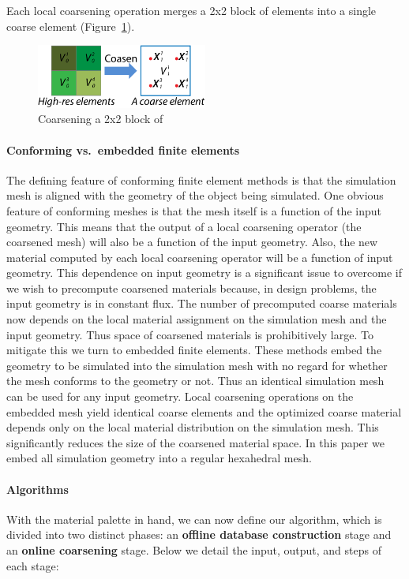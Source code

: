 Each local coarsening operation merges a 2x2 block of elements into a single coarse element (Figure~\ref{fig:coarsen}).
\begin{figure}
	\centering
	
	\includegraphics[width=0.5\textwidth]{images/coarsen.pdf}
	\caption{Coarsening a 2x2 block of }
	\label{fig:coarsen}
\end{figure}
\paragraph{Conforming vs.~embedded finite elements}
The defining feature of conforming finite element methods is that the simulation mesh is aligned with the geometry of the object being simulated. One obvious feature of conforming meshes is that the mesh itself is a function of the input geometry. This means that the output of a local coarsening operator (the coarsened mesh) will also be a function of the input geometry. Also, the new material computed by each local coarsening operator will be a function of input geometry. This dependence on input geometry is a significant issue to overcome if we wish to precompute coarsened materials because, in design problems, the input geometry is in constant flux. The number of precomputed coarse materials now depends on the local material assignment on the simulation mesh and the input geometry. Thus space of coarsened materials is prohibitively large. 
To mitigate this we turn to embedded finite elements. These methods embed the geometry to be simulated into the simulation mesh with no regard for whether the mesh conforms to the geometry or not. Thus an identical simulation mesh can be used for any input geometry. Local coarsening operations on the embedded mesh yield identical coarse elements and the optimized coarse material depends only on the local material distribution on the simulation mesh.  This significantly reduces the size of the coarsened material space. In this paper we embed all simulation geometry into a regular hexahedral mesh.

\paragraph{Algorithms}
With the material palette in hand, we can now define our algorithm, which is divided into two distinct phases: an \textbf{offline database construction} stage and an \textbf{online coarsening} stage.  Below we detail the input, output, and steps of each stage:

